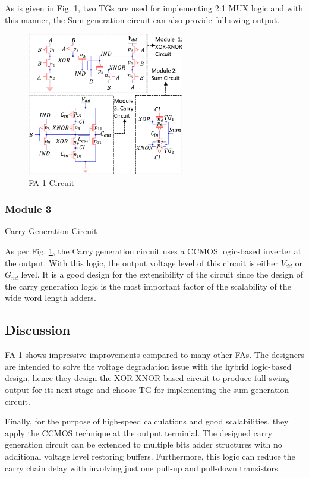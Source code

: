 \documentclass[conference]{IEEEtran}
\begin{document}
As is given in Fig. \ref{fig:fa1-circuit}, two TGs are used for implementing 2:1 MUX logic and with this manner,
the Sum generation circuit can also provide full swing output.

\begin{figure}[!hb]
	\centering
	\includegraphics[width=2.7in]{fa1-circuit.png}
	\caption{FA-1 Circuit}
	\label{fig:fa1-circuit}
\end{figure}

\subsubsection{Module 3}Carry Generation Circuit

As per Fig. \ref{fig:fa1-circuit}, the Carry generation circuit uses a CCMOS logic-based inverter at the output.
With this logic, the output voltage level of this circuit is either \(V_{dd}\) or \(G_{nd}\) level.
It is a good design for the extensibility of the circuit
since the design of the carry generation logic is the most important factor of the scalability of the wide word length adders.


\subsection{Discussion}

FA-1 shows impressive improvements compared to many other FAs.
The designers are intended to solve the voltage degradation issue with the hybrid logic-based design,
hence they design the XOR-XNOR-based circuit to produce full swing output for its next stage
and choose TG for implementing the sum generation circuit.

Finally, for the purpose of high-speed calculations and good scalabilities,
they apply the CCMOS technique at the output terminial.
The designed carry generation circuit can be extended to multiple bits adder structures with no additional voltage level restoring buffers.
Furthermore, this logic can reduce the carry chain delay with involving just one pull-up and pull-down transistors.
\end{document}
